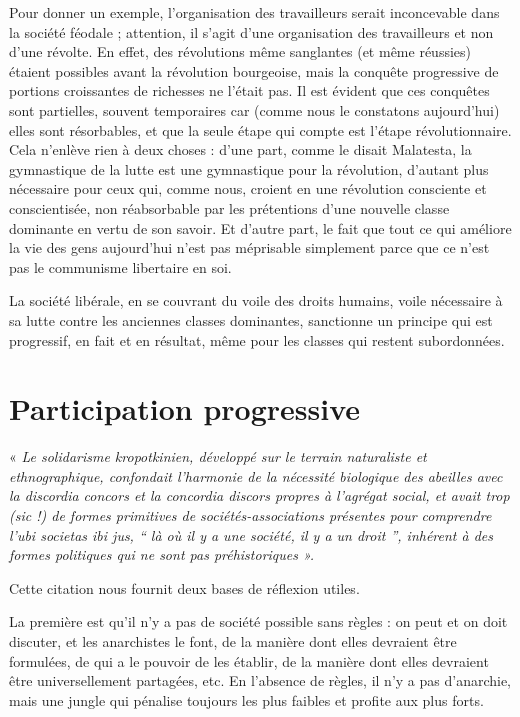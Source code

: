 Pour donner un exemple, l'organisation des travailleurs serait inconcevable dans la société féodale ; attention, il s'agit d'une organisation des travailleurs et non d'une révolte. En effet, des révolutions même sanglantes (et même réussies) étaient possibles avant la révolution bourgeoise, mais la conquête progressive de portions croissantes de richesses ne l'était pas. Il est évident que ces conquêtes sont partielles, souvent temporaires car (comme nous le constatons aujourd'hui) elles sont résorbables, et que la seule étape qui compte est l'étape révolutionnaire. Cela n'enlève rien à deux choses : d'une part, comme le disait Malatesta, la gymnastique de la lutte est une gymnastique pour la révolution, d'autant plus nécessaire pour ceux qui, comme nous, croient en une révolution consciente et conscientisée, non réabsorbable par les prétentions d'une nouvelle classe dominante en vertu de son savoir. Et d'autre part, le fait que tout ce qui améliore la vie des gens aujourd'hui n'est pas méprisable simplement parce que ce n'est pas le communisme libertaire en soi.

La société libérale, en se couvrant du voile des droits humains, voile nécessaire à sa lutte contre les anciennes classes dominantes, sanctionne un principe qui est progressif, en fait et en résultat, même pour les classes qui restent subordonnées.

\section{Participation progressive}

« \emph{Le solidarisme kropotkinien, développé sur le terrain naturaliste et ethnographique, confondait l'harmonie de la nécessité biologique des abeilles avec la discordia concors et la concordia discors propres à l'agrégat social, et avait trop (sic !) de formes primitives de sociétés-associations présentes pour comprendre l'ubi societas ibi jus, “ là où il y a une société, il y a un droit ”, inhérent à des formes politiques qui ne sont pas préhistoriques ».}

Cette citation nous fournit deux bases de réflexion utiles.

La première est qu'il n'y a pas de société possible sans règles : on peut et on doit discuter, et les anarchistes le font, de la manière dont elles devraient être formulées, de qui a le pouvoir de les établir, de la manière dont elles devraient être universellement partagées, etc. En l'absence de règles, il n'y a pas d'anarchie, mais une jungle qui pénalise toujours les plus faibles et profite aux plus forts.

